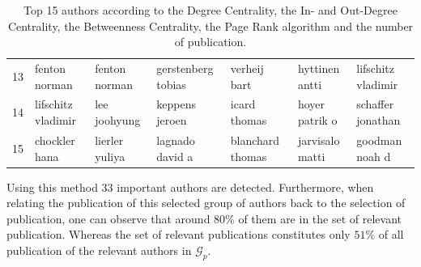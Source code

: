 \documentclass[11pt,a4paper]{book}
\theoremstyle{definition}
\theoremstyle{definition}
\theoremstyle{definition}
\theoremstyle{remark}
\newcommand{\pgraph}{\mathcal{G}_{p}}
\begin{document}
\begin{table}
\begin{tabular}{lllllll}
13 &          fenton norman &          fenton norman &     gerstenberg tobias &           verheij bart &         hyttinen antti &     lifschitz vladimir \\
14 &     lifschitz vladimir &           lee joohyung &         keppens jeroen &           icard thomas &         hoyer patrik o &      schaffer jonathan \\
15 &          chockler hana &         lierler yuliya &        lagnado david a &       blanchard thomas &        jarvisalo matti &         goodman noah d \\
\bottomrule
\end{tabular}
\caption{Top 15 authors according to the Degree Centrality, the In- and Out-Degree Centrality, the Betweenness Centrality, the Page Rank algorithm and the number of publication.}
\label{tab:author_ranking}
\end{table}


Using this method $33$ important authors are detected. Furthermore, when relating the publication of this selected group of authors back to the selection of publication, one can
observe that around $80\%$ of them are in the set of relevant publication. Whereas the set of relevant publications constitutes only $51\%$ of all publication of the relevant authors  in $\pgraph$. 
\end{document}
